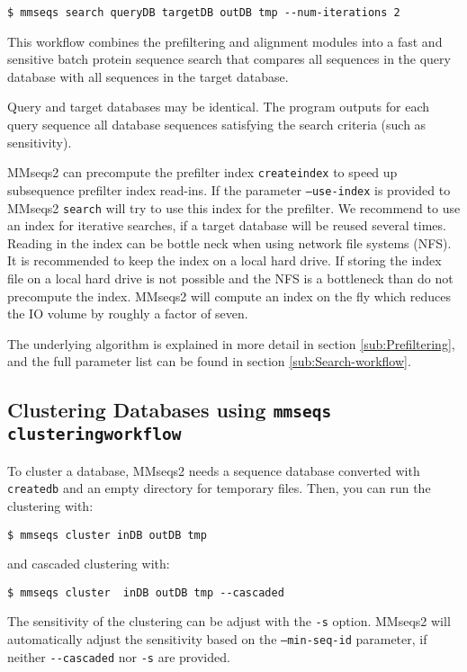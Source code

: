 \documentclass[11pt,a4paper]{scrreprt}
\begin{document}
\begin{verbatim}
$ mmseqs search queryDB targetDB outDB tmp --num-iterations 2
\end{verbatim}

This workflow combines the prefiltering and alignment modules into a fast and sensitive batch protein sequence search that compares all sequences in the query database with all sequences in the target database.

Query and target databases may be identical. The program outputs for each query sequence all database sequences satisfying the search criteria (such as sensitivity).

MMseqs2 can precompute the prefilter index \texttt{createindex} to speed up subsequence prefilter index read-ins. If the parameter \texttt{--use-index} is provided to MMseqs2 \texttt{search} will try to use this index for the prefilter. We recommend to use an index for iterative searches, if a target database will be reused several times. Reading in the index can be bottle neck when using network file systems (NFS). It is recommended to keep the index on a local hard drive. If storing the index file on a local hard drive is not possible and the NFS is a bottleneck than do not precompute the index. MMseqs2 will compute an index on the fly which reduces the IO volume by roughly a factor of seven.

The underlying algorithm is explained in more detail in section \ref{sub:Prefiltering}, and the full parameter list can be found in section \ref{sub:Search-workflow}.
\subsection{Clustering Databases using \texttt{mmseqs clusteringworkflow}} \label{sub:Clustering}
To cluster a database, MMseqs2 needs a sequence database converted with \texttt{createdb} and an empty directory for temporary files. Then, you can run the clustering with:

\begin{verbatim}
$ mmseqs cluster inDB outDB tmp
\end{verbatim}

and cascaded clustering with:

\begin{verbatim}
$ mmseqs cluster  inDB outDB tmp --cascaded
\end{verbatim}

The sensitivity of the clustering can be adjust with the \texttt{-s} option. MMseqs2 will automatically adjust the sensitivity based on the \texttt{--min-seq-id} parameter, if neither \texttt{-{}-cascaded} nor \texttt{-s} are  provided. 
\end{document}
